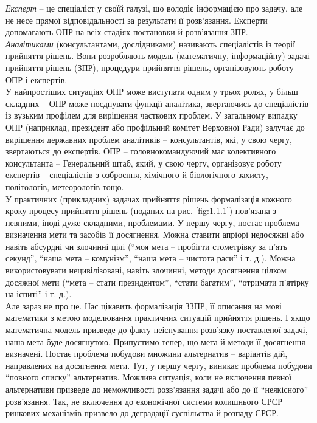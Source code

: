 \textit{Експерт} -- це спеціаліст у своїй галузі, що володіє інформацією про задачу, але не несе прямої відповідальності за результати її розв'язання. Експерти допомагають ОПР на всіх стадіях постановки й розв'язання ЗПР. \\

\textit{Аналітиками} (консультантами, дослідниками) називають спеціалістів із теорії прийняття рішень. Вони розробляють модель (математичну, інформаційну) задачі прийняття рішень (ЗПР), процедури прийняття рішень, організовують роботу ОПР і експертів. \\

У найпростіших ситуаціях ОПР може виступати одним у трьох ролях, у більш складних -- ОПР може поєднувати функції аналітика, звертаючись до спеціалістів із вузьким профілем для вирішення часткових проблем. У загальному випадку ОПР (наприклад, президент або профільний комітет Верховної Ради) залучає до вирішення державних проблем аналітиків -- консультантів, які, у свою чергу, звертаються до експертів. ОПР -- головнокомандуючий має колективного консультанта -- Генеральний штаб, який, у свою чергу, організовує роботу експертів -- спеціалістів з озброєння, хімічного й біологічного захисту, політологів, метеорологів тощо. \\

У практичних (прикладних) задачах прийняття рішень формалізація кожного кроку процесу прийняття рішень (поданих на рис. \ref{fig:1.1.1}) пов'язана з певними, іноді дуже складними, проблемами. У першу чергу, постає проблема визначення мети та засобів її досягнення. Можна ставити апріорі недосяжні або навіть абсурдні чи злочинні цілі (``моя мета -- пробігти стометрівку за п'ять секунд'', ``наша мета -- комунізм'', ``наша мета -- чистота раси'' і т. д.). Можна використовувати нецивілізовані, навіть злочинні, методи досягнення цілком досяжної мети (``мета -- стати президентом'', ``стати багатим'', ``отримати п'ятірку на іспиті'' і т. д.). \\

Але зараз не про це. Нас цікавить формалізація ЗЗПР, її описання на мові математики з метою моделювання практичних ситуацій прийняття рішень. І якщо математична модель призведе до факту неіснування розв'язку поставленої задачі, наша мета буде досягнутою. Припустимо тепер, що мета й методи її досягнення визначені. Постає проблема побудови множини альтернатив -- варіантів дій, направлених на досягнення мети. Тут, у першу чергу, виникає проблема побудови ``повного списку'' альтернатив. Можлива ситуація, коли не включення певної альтернативи призведе до неможливості розв'язання задачі або до її ``неякісного'' розв'язання. Так, не включення до економічної системи колишнього СРСР ринкових механізмів призвело до деградації суспільства й розпаду СРСР. \\

